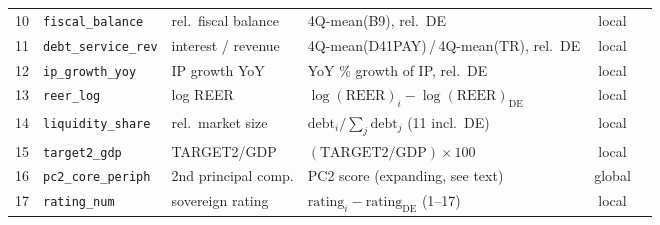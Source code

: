 \begin{table}[htbp]
{\begin{tabular}{@{}clllcl@{}}
        10 & \texttt{fiscal\_balance}          & rel.\ fiscal balance     & 4Q-mean(B9), rel.\ DE                                                        & local  & \parencite{afonso2015} \\
        11 & \texttt{debt\_service\_rev}       & interest / revenue       & 4Q-mean(D41PAY)\,/\,4Q-mean(TR), rel.\ DE                                    & local  & \parencite{bernoth2004sovereign} \\
        12 & \texttt{ip\_growth\_yoy}          & IP growth YoY            & YoY \% growth of IP, rel.\ DE                                                & local  & \parencite{afonso2015} \\
        13 & \texttt{reer\_log}                & log REER                 & $\log(\text{REER})_i-\log(\text{REER})_{\text{DE}}$                          & local  & \parencite{afonso2015} \\
        14 & \texttt{liquidity\_share}         & rel.\ market size        & $\text{debt}_i/\sum_{j}\text{debt}_j$ (11 incl.\ DE)                         & local  & \parencite{bernoth2004sovereign} \\
        15 & \texttt{target2\_gdp}             & TARGET2/GDP              & $(\text{TARGET2}/\text{GDP})\times100$                                       & local  & \parencite{degrauweji2013} \\
        16 & \texttt{pc2\_core\_periph}        & 2nd principal comp.      & PC2 score (expanding, see text)                                             & global & \parencite{afonso2015} \\
        17 & \texttt{rating\_num}              & sovereign rating         & $\text{rating}_i-\text{rating}_{\text{DE}}$ (1--17)                          & local  & \parencite{afonso2012sovereign} \\
        \bottomrule
    \end{tabular}%
    }
\end{table}

